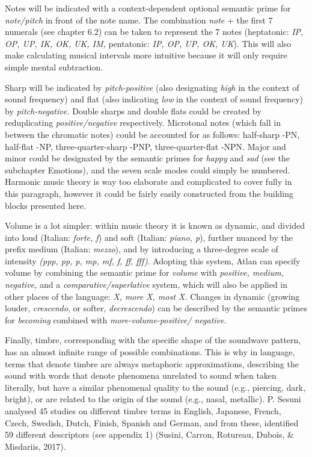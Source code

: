 Notes will be indicated with a context-dependent optional semantic prime for \textit{note/pitch} in front of the note name. The combination {\it note} + the first 7 numerals (see chapter 6.2) can be taken to represent the 7 notes (heptatonic: \textit{IP, OP, UP, IK, OK, UK, IM,} pentatonic: \textit{IP, OP, UP, OK, UK}). This will also make calculating musical intervals more intuitive because it will only require simple mental subtraction. 

Sharp will be indicated by \textit{pitch-positive} (also designating \textit{high} in the context of sound frequency) and flat (also indicating \textit{low} in the context of sound frequency) by \textit{pitch-negative.} Double sharps and double flats could be created by reduplicating \textit{positive/negative} respectively. Microtonal notes (which fall in between the chromatic notes) could be accounted for as follows: half-sharp -PN, half-flat -NP, three-quarter-sharp  -PNP, three-quarter-flat -NPN. Major and minor could be designated by the semantic primes for \textit{happy} and \textit{sad} (see the subchapter Emotions), and the seven scale modes could simply be numbered. Harmonic music theory is way too elaborate and complicated to cover fully in this paragraph, however it could be fairly easily constructed from the building blocks presented here. 

Volume is a lot simpler: within music theory it is known as dynamic, and divided into loud (Italian: \textit{forte, f}) and soft (Italian: \textit{piano, p}), further nuanced by the prefix medium (Italian: \textit{mezzo}), and by introducing a three-degree scale of intensity \textit{(ppp, pp, p, mp, mf, f, ff, fff)}. Adopting this system, Atlan can specify volume by combining the semantic prime for \textit{volume} with \textit{positive, medium, negative,} and a \textit{comparative/superlative} system, which will also be applied in other places of the language: \textit{X, more X, most X.} Changes in dynamic (growing louder, \textit{crescendo}, or softer, \textit{decrescendo}) can be described by the semantic primes for \textit{becoming} combined with \textit{more-volume-positive/ negative.} 

Finally, timbre, corresponding with the specific shape of the soundwave pattern, has an almost infinite range of possible combinations. This is why in language, terms that denote timbre are always metaphoric approximations, describing the sound with words that denote phenomena unrelated to sound when taken literally, but have a similar phenomenal quality to the sound (e.g., piercing, dark, bright), or are related to the origin of the sound (e.g., nasal, metallic). P. Sesuni analysed 45 studies on different timbre terms in English, Japanese, French, Czech, Swedish, Dutch, Finish, Spanish and German, and from these, identified 59 different descriptors (see appendix 1) (Susini, Carron, Rotureau, Dubois, \& Misdariis, 2017). 

